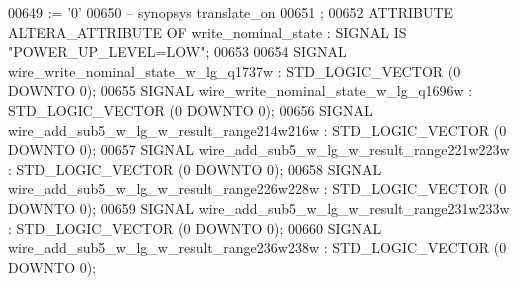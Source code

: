 \begin{DoxyCode}
{00649       \textcolor{vhdlchar}{:=} \textcolor{vhdlchar}{'}\textcolor{vhdllogic}{}\textcolor{vhdllogic}{0}\textcolor{vhdlchar}{'}
00650 \textcolor{keyword}{     -- synopsys translate\_on}
00651      ;
00652      \textcolor{keywordflow}{ATTRIBUTE} \textcolor{vhdlchar}{ALTERA_ATTRIBUTE} \textcolor{keywordflow}{OF} \textcolor{vhdlchar}{write_nominal_state} \textcolor{vhdlchar}{:} \textcolor{keywordflow}{SIGNAL} \textcolor{keywordflow}{IS} \textcolor{keyword}{"POWER\_UP\_LEVEL=LOW"};
00653 
00654      \textcolor{keywordflow}{SIGNAL}  \textcolor{vhdlchar}{wire_write_nominal_state_w_lg_q1737w}   \textcolor{vhdlchar}{:}   \textcolor{comment}{STD\_LOGIC\_VECTOR} \textcolor{vhdlchar}{(}\textcolor{vhdllogic}{}\textcolor{vhdllogic}{0} \textcolor{keywordflow}{DOWNTO} \textcolor{vhdllogic}{}\textcolor{vhdllogic}{0}\textcolor{vhdlchar}{)};
00655      \textcolor{keywordflow}{SIGNAL}  \textcolor{vhdlchar}{wire_write_nominal_state_w_lg_q1696w}   \textcolor{vhdlchar}{:}   \textcolor{comment}{STD\_LOGIC\_VECTOR} \textcolor{vhdlchar}{(}\textcolor{vhdllogic}{}\textcolor{vhdllogic}{0} \textcolor{keywordflow}{DOWNTO} \textcolor{vhdllogic}{}\textcolor{vhdllogic}{0}\textcolor{vhdlchar}{)};
00656      \textcolor{keywordflow}{SIGNAL}  \textcolor{vhdlchar}{wire_add_sub5_w_lg_w_result_range214w216w}  \textcolor{vhdlchar}{:}   \textcolor{comment}{STD\_LOGIC\_VECTOR} \textcolor{vhdlchar}{(}\textcolor{vhdllogic}{}\textcolor{vhdllogic}{0} \textcolor{keywordflow}{DOWNTO} \textcolor{vhdllogic}{}\textcolor{vhdllogic}{0}\textcolor{vhdlchar}{)};
00657      \textcolor{keywordflow}{SIGNAL}  \textcolor{vhdlchar}{wire_add_sub5_w_lg_w_result_range221w223w}  \textcolor{vhdlchar}{:}   \textcolor{comment}{STD\_LOGIC\_VECTOR} \textcolor{vhdlchar}{(}\textcolor{vhdllogic}{}\textcolor{vhdllogic}{0} \textcolor{keywordflow}{DOWNTO} \textcolor{vhdllogic}{}\textcolor{vhdllogic}{0}\textcolor{vhdlchar}{)};
00658      \textcolor{keywordflow}{SIGNAL}  \textcolor{vhdlchar}{wire_add_sub5_w_lg_w_result_range226w228w}  \textcolor{vhdlchar}{:}   \textcolor{comment}{STD\_LOGIC\_VECTOR} \textcolor{vhdlchar}{(}\textcolor{vhdllogic}{}\textcolor{vhdllogic}{0} \textcolor{keywordflow}{DOWNTO} \textcolor{vhdllogic}{}\textcolor{vhdllogic}{0}\textcolor{vhdlchar}{)};
00659      \textcolor{keywordflow}{SIGNAL}  \textcolor{vhdlchar}{wire_add_sub5_w_lg_w_result_range231w233w}  \textcolor{vhdlchar}{:}   \textcolor{comment}{STD\_LOGIC\_VECTOR} \textcolor{vhdlchar}{(}\textcolor{vhdllogic}{}\textcolor{vhdllogic}{0} \textcolor{keywordflow}{DOWNTO} \textcolor{vhdllogic}{}\textcolor{vhdllogic}{0}\textcolor{vhdlchar}{)};
00660      \textcolor{keywordflow}{SIGNAL}  \textcolor{vhdlchar}{wire_add_sub5_w_lg_w_result_range236w238w}  \textcolor{vhdlchar}{:}   \textcolor{comment}{STD\_LOGIC\_VECTOR} \textcolor{vhdlchar}{(}\textcolor{vhdllogic}{}\textcolor{vhdllogic}{0} \textcolor{keywordflow}{DOWNTO} \textcolor{vhdllogic}{}\textcolor{vhdllogic}{0}\textcolor{vhdlchar}{)};
}
\end{DoxyCode}
